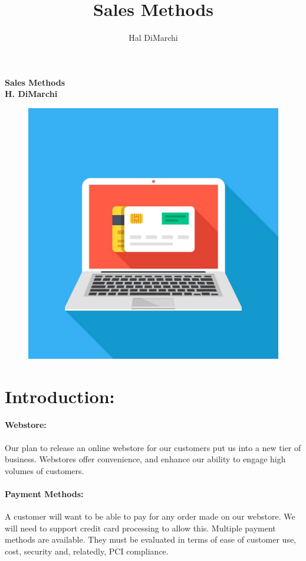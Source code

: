 \documentclass[letterpaper]{article}
\title{Sales Methods}
\author{Hal DiMarchi}
\begin{document}
  \pagecolor{cyan!10}
  \begin{titlepage}
    \centering
    \vfill
    {\bfseries\Large
        Sales Methods\\
        H. DiMarchi\\
    }
    \begin{figure}[h]
      \centering
      \includegraphics[width=12cm]{best-online-credit-card-processing}
    \end{figure}


  \end{titlepage}
  \tableofcontents
  \newpage
  \section{Introduction:}
    \paragraph{Webstore:}
    Our plan to release an online webstore for our customers put us into a new
    tier of business. Webstores offer convenience, and enhance
    our ability to engage high volumes of customers.
    \paragraph{Payment Methods:}
    A customer will want to be able to pay for any order made on our webstore. We will need to support
    credit card processing to allow this. Multiple payment methods are available. They must be evaluated
    in terms of ease of customer use, cost, security and, relatedly, PCI compliance.
\end{document}
